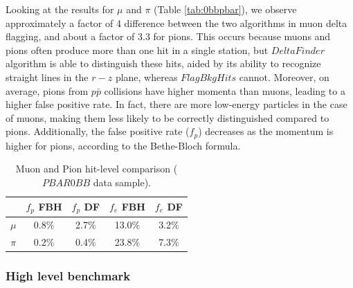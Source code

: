     Looking at the results for $\mu$ and $\pi$ (Table \ref{tab:0bbpbar}), 
    we observe approximately 
    a factor of 4 difference between the two algorithms in muon delta 
    flagging, and about a factor of 3.3 for pions. This occurs because 
    muons and pions often produce more than one hit in a single station, but  
    $DeltaFinder$ algorithm is able to distinguish these hits, 
    aided by its ability to recognize straight lines in the 
    $r-z$ plane, whereas $FlagBkgHits$ cannot. Moreover, on average, 
    pions from $p\bar{p}$ collisions have higher momenta than muons, 
    leading to a higher false positive rate. In fact, there are more 
    low-energy particles in the case of muons, making them less likely 
    to be correctly distinguished compared to pions. Additionally, the 
    false positive rate ($f_p$) decreases as the momentum is higher 
    for pions, according to the Bethe-Bloch formula.

    \begin{center}
        \begin{table}[h!]
        \centering
        \renewcommand{\arraystretch}{1.}
        \begin{tabular}{| c | c | c | c | c|} 
        \hline
        &$f_{p}$ FBH  &  $f_{p}$ DF &  $f_{e}$ FBH & $f_{e}$ DF\\
        \hline
        $\mu$ & 0.8\% &  2.7\%  & 13.0\% & 3.2\%\\
        \hline
        $\pi$ & 0.2\%& 0.4\% & 23.8\%& 7.3\%\\
        \hline
        \end{tabular}
        \caption[Muon and Pion hit-level comparison.]{Muon and Pion 
        hit-level comparison ($PBAR0BB$ data sample).}
        \end{table}\label{tab:0bbpbar}
        \end{center}



   








\subsubsection{High level benchmark}

